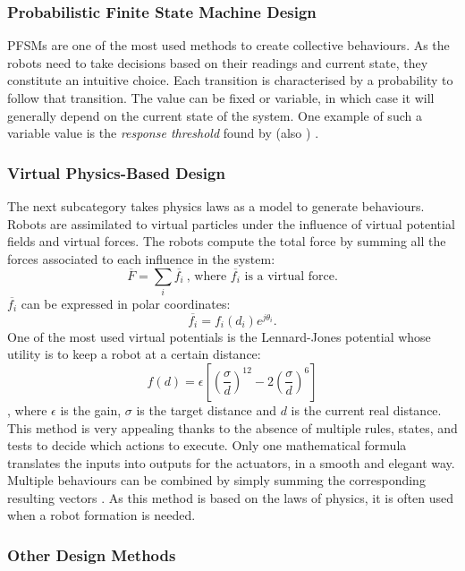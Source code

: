 \documentclass[a4paper, 12pt]{report}
\begin{document}
			\subsubsection{Probabilistic Finite State Machine Design}
			
			PFSMs \citep{minsky1967computation} are one of the most used methods to create collective behaviours. As the robots need to take decisions based on their readings and current state, they constitute an intuitive choice. Each transition is characterised by a probability to follow that transition. The value can be fixed or variable, in which case it will generally depend on the current state of the system. One example of such a variable value is the \emph{response threshold} found by \citet{granovetter1978threshold} (also \citet{bonabeau1997adaptive}) .
			
			\subsubsection{Virtual Physics-Based Design}
			
			The next subcategory takes physics laws as a model to generate behaviours. Robots are assimilated to virtual particles under the influence of virtual potential fields and virtual forces. The robots compute the total force by summing all the forces associated to each influence in the system:
			$$\overline{F} = \sum_{i}{\overline{f_i}} ~\mbox{, where $\overline{f_i}$ is a virtual force.}$$
			$\overline{f_i}$ can be expressed in polar coordinates: $$\overline{f_i} = f_i(d_i)e^{j\theta_i}.$$ 
			One of the most used virtual potentials is the Lennard-Jones potential whose utility is to keep a robot at a certain distance: 
			$$ f(d) = \epsilon \left[ \left(\frac{\sigma}{d}\right)^{12} - 2 \left(\frac{\sigma}{d}\right)^6 \right]$$, where $\epsilon$ is the gain, $\sigma$ is the target distance and $d$ is the current real distance. 
			This method is very appealing thanks to the absence of multiple rules, states, and tests to decide which actions to execute. Only one mathematical formula translates the inputs into outputs for the actuators, in a smooth and elegant way. Multiple behaviours can be combined by simply summing the corresponding resulting vectors \citep{brambilla2013swarm}. As this method is based on the laws of physics, it is often used when a robot formation is needed.
			
			\subsubsection{Other Design Methods}
		
\end{document}
